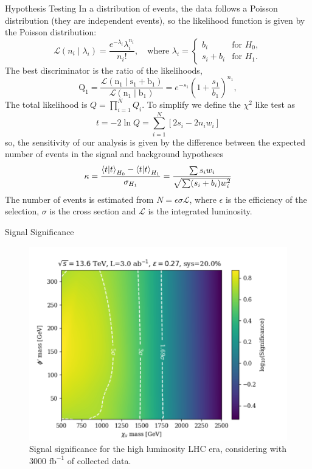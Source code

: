 \documentclass{../bredelebeamer}
\begin{document}
\begin{frame}{Hypothesis Testing}
	In a distribution of events, the data follows a Poisson distribution (they are independent events), so the likelihood function is given by the Poisson distribution:
	\begin{equation}
    \mathcal{L}(n_i \mid \lambda_i) = \frac{e^{-\lambda_i} \lambda_i^{n_i}}{n_i!}, \quad \text{where } \lambda_i = 
    \begin{cases}
        b_i & \text{for } H_0, \\
        s_i + b_i & \text{for } H_1.
    \end{cases}
	\end{equation}
	The best discriminator is the ratio of the likelihoods, 
	\begin{equation}
		\mathrm{Q}_1=\frac{\mathcal{L}\left(\mathrm{n}_1 \mid \mathrm{s}_1+\mathrm{b}_1\right)}{\mathcal{L}\left(\mathrm{n}_1 \mid \mathrm{b}_1\right)}=e^{-s_1}\left(1+\frac{s_1}{b_1}\right)^{n_1},
	\end{equation}
	The total likelihood is $Q=\prod_{i=1}^N Q_i$. To simplify we define the $\chi^2$ like test as 
	\begin{equation}
		t=-2\ln Q = \sum_{i=1}^{N} \left[2s_i - 2n_i w_i\right]
	\end{equation}
	so, the sensitivity of our analysis is given by the difference between the expected number of events in the signal and background hypotheses
	\begin{equation}
	\kappa = \frac{\braket{t}_{H_0} - \braket{t}_{H_1}}{\sigma_{H_1}}=
	\frac{\sum s_i w_i}{\sqrt{\sum (s_i + b_i) w_i^2}}
	\end{equation}
	The number of events is estimated from $N=\epsilon \sigma \mathcal{L}$, where $\epsilon$ is the efficiency of the selection, $\sigma$ is the cross section and $\mathcal{L}$ is the integrated luminosity.


	
\end{frame}

\begin{frame}{Signal Significance}
	\begin{figure}[]
		\centering
		\includegraphics[width=.6\linewidth]{significance.pdf}
		\caption{Signal significance for the high luminosity LHC era, considering with 3000  $\mathrm{fb}^{-1}$ of collected data.}
		\label{fig:/significance_3000}
	\end{figure}
\end{frame}
\end{document}
